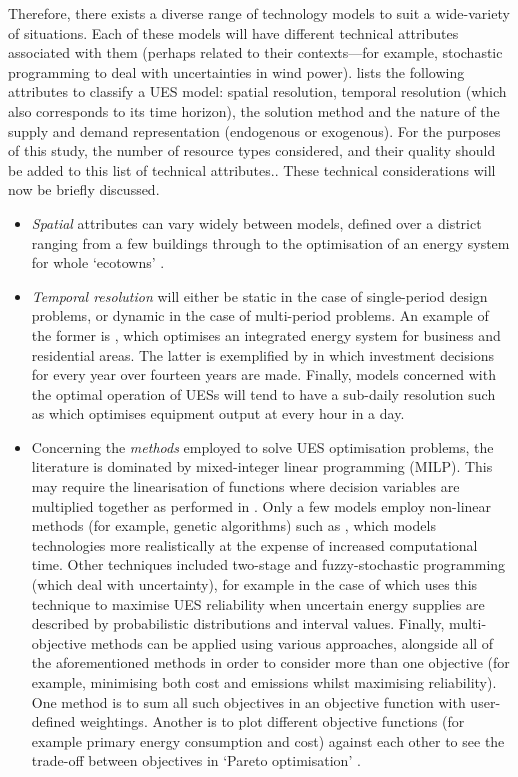 Therefore, there exists a diverse range of technology models to suit a wide-variety of situations. Each of these models will have different technical attributes associated with them (perhaps related to their contexts---for example, stochastic programming to deal with uncertainties in wind power). \citet{Keirstead2012b} lists the following attributes to classify a UES model: spatial resolution, temporal resolution (which also corresponds to its time horizon), the solution method and the nature of the supply and demand representation (endogenous or exogenous). For the purposes of this study, the number of resource types considered, and their quality should be added to this list of technical attributes.. These technical considerations will now be briefly discussed.
\begin{itemize}
	\item \emph{Spatial} attributes can vary widely between models, defined over a district ranging from a few buildings \citep{Bojic2010} through to the optimisation of an energy system for whole `ecotowns' \citep{Keirstead2012}. 
	\item \emph{Temporal resolution} will either be static in the case of single-period design problems, or dynamic in the case of multi-period problems. An example of the former is \citet{Sugihara2004}, which optimises an integrated energy system for business and residential areas. The latter is exemplified by\citet{Sirikitputtisak2009} in which investment decisions for every year over fourteen years are made. Finally, models concerned with the optimal operation of UESs will tend to have a sub-daily resolution such as \citet{Ooka2009} which optimises equipment output at every hour in a day. 
	\item Concerning the \emph{methods} employed to solve UES optimisation problems, the literature is dominated by mixed-integer linear programming (MILP). This may require the linearisation of functions where decision variables are multiplied together as performed in \citet{Sirikitputtisak2009}. Only a few models employ non-linear methods (for example, genetic algorithms) such as \citet{Ooka2009}, which models technologies more realistically at the expense of increased computational time. Other techniques included two-stage and fuzzy-stochastic programming (which deal with uncertainty), for example in the case of \citet{Cai2009a} which uses this technique to maximise UES reliability when uncertain energy supplies are described by probabilistic distributions and interval values. Finally, multi-objective methods can be applied using various approaches, alongside all of the aforementioned methods in order to consider more than one objective (for example, minimising both cost and emissions whilst maximising reliability). One method is to sum all such objectives in an objective function with user-defined weightings. Another is to plot different objective functions (for example primary energy consumption and cost) against each other to see the trade-off between objectives in `Pareto optimisation' \citep{Sugihara2004}.

\end{itemize}
